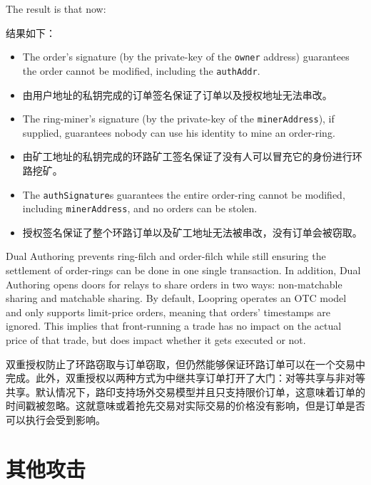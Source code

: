 \documentclass[UTF8,nofonts]{ctexart}
\begin{document}
\begin{multicols}{2}
\begin{enumerate}
 
\end{enumerate}

The result is that now:

结果如下：


\begin{itemize}

	\item  The order's signature (by the private-key of the \verb|owner| address) guarantees the order cannot be modified, including the \verb|authAddr|.
	\item 由用户地址的私钥完成的订单签名保证了订单以及授权地址无法串改。

	\item  The ring-miner's signature (by the private-key of the \verb|minerAddress|), if supplied, guarantees nobody can use his identity to mine an order-ring.
	\item 由矿工地址的私钥完成的环路矿工签名保证了没有人可以冒充它的身份进行环路挖矿。

	\item  The \verb|authSignature|s guarantees the entire order-ring cannot be modified, including \verb|minerAddress|, and no orders can be stolen.
	\item 授权签名保证了整个环路订单以及矿工地址无法被串改，没有订单会被窃取。


\end{itemize}

Dual Authoring prevents ring-filch and order-filch while still ensuring the settlement of order-rings can be done in one single transaction. In addition, Dual Authoring opens doors for relays to share orders in two ways: non-matchable sharing and matchable sharing. By default, Loopring operates an OTC model and only supports limit-price orders, meaning that orders' timestamps are ignored. This implies that front-running a trade has no impact on the actual price of that trade, but does impact whether it gets executed or not.

双重授权防止了环路窃取与订单窃取，但仍然能够保证环路订单可以在一个交易中完成。此外，双重授权以两种方式为中继共享订单打开了大门：对等共享与非对等共享。默认情况下，路印支持场外交易模型并且只支持限价订单，这意味着订单的时间戳被忽略。这就意味或着抢先交易对实际交易的价格没有影响，但是订单是否可以执行会受到影响。


\section{其他攻击}


\end{multicols}
\end{document}
